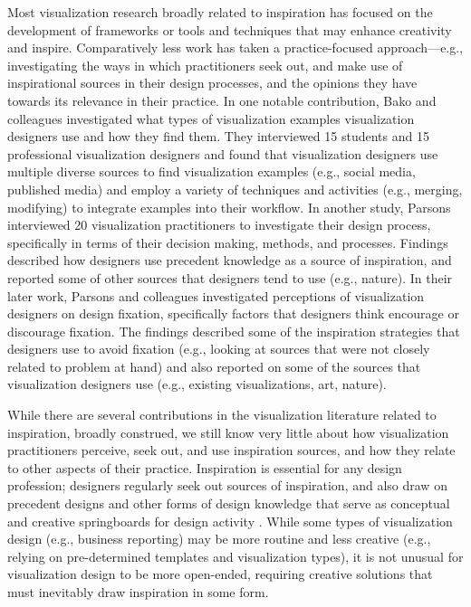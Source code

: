 Most visualization research broadly related to inspiration has focused on the development of frameworks or tools and techniques that may enhance creativity and inspire. Comparatively less work has taken a practice-focused approach---e.g., investigating the ways in which practitioners seek out, and make use of inspirational sources in their design processes, and the opinions they have towards its relevance in their practice. In one notable contribution, Bako and colleagues \cite{bako_understanding_2022} investigated what types of visualization examples visualization designers use and how they find them. They interviewed 15 students and 15 professional visualization designers and found that visualization designers use multiple diverse sources to find visualization examples (e.g., social media, published media) and employ a variety of techniques and activities (e.g., merging, modifying) to integrate examples into their workflow. In another study, Parsons \cite{parsons_understanding_2022} interviewed 20 visualization practitioners to investigate their design process, specifically in terms of their decision making, methods, and processes. Findings described how designers use precedent knowledge as a source of inspiration, and reported some of other sources that designers tend to use (e.g., nature). In their later work, Parsons and colleagues \cite{parsons_fixation_2021} investigated perceptions of visualization designers on design fixation, specifically factors that designers think encourage or discourage fixation. The findings described some of the inspiration strategies that designers use to avoid fixation (e.g., looking at sources that were not closely related to problem at hand) and also reported on some of the sources that visualization designers use (e.g., existing visualizations, art, nature). 

While there are several contributions in the visualization literature related to inspiration, broadly construed, we still know very little about how visualization practitioners perceive, seek out, and use inspiration sources, and how they relate to other aspects of their practice. Inspiration is essential for any design profession; designers regularly seek out sources of inspiration, and also draw on precedent designs and other forms of design knowledge that serve as conceptual and creative springboards for design activity \cite{leifer_early_2014, eckert_sources_2000, koronis_crafting_2021}. While some types of visualization design (e.g., business reporting) may be more routine and less creative (e.g., relying on pre-determined templates and visualization types), it is not unusual for visualization design to be more open-ended, requiring creative solutions that must inevitably draw inspiration in some form.